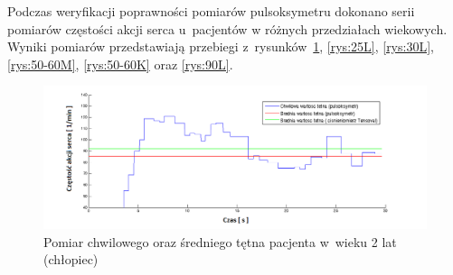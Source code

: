 \noindent Podczas weryfikacji poprawności pomiarów pulsoksymetru dokonano serii pomiarów częstości akcji serca u~pacjentów
w różnych przedziałach wiekowych. Wyniki pomiarów przedstawiają przebiegi z~rysunków~\ref{rys:2L}, \ref{rys:25L}, \ref{rys:30L},
\ref{rys:50-60M}, \ref{rys:50-60K} oraz \ref{rys:90L}.
\begin{figure}[!ht]
	\centerline{\includegraphics[scale = 0.6]{graphic/2L}}
	\caption{Pomiar chwilowego oraz średniego tętna pacjenta w~wieku 2 lat (chłopiec)}
	\label{rys:2L}
\end{figure}


